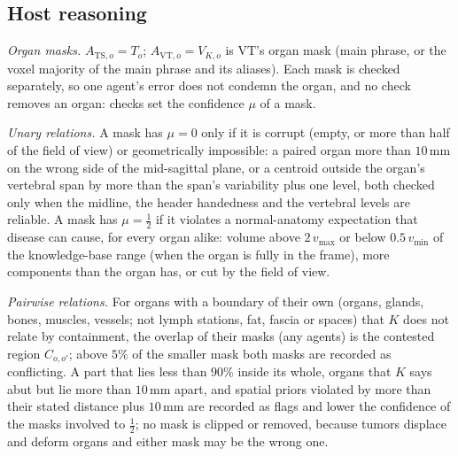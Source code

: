 \documentclass[fleqn,10pt]{olplainarticle}
\begin{document}
\subsection{Host reasoning}
\label{sec:host_details}
\emph{Organ masks.} $A_{\mathrm{TS},o}=T_o$; $A_{\mathrm{VT},o}=V_{K,o}$ is VT's organ mask (main phrase, or the voxel
majority of the main phrase and its aliases). Each mask is checked separately, so one agent's error does not condemn the
organ, and no check removes an organ: checks set the confidence $\mu$ of a mask.

\emph{Unary relations.} A mask has $\mu=0$ only if it is corrupt (empty, or more than half of the field of view) or
geometrically impossible: a paired organ more than $10$\,mm on the wrong side of the mid-sagittal plane, or a centroid
outside the organ's vertebral span by more than the span's variability plus one level, both checked only when the
midline, the header handedness and the vertebral levels are reliable. A mask has $\mu=\tfrac12$ if it violates a
normal-anatomy expectation that disease can cause, for every organ alike: volume above $2\,v_{\max}$ or below
$0.5\,v_{\min}$ of the knowledge-base range (when the organ is fully in the frame), more components than the organ has, or
cut by the field of view.

\emph{Pairwise relations.} For organs with a boundary of their own (organs, glands, bones, muscles, vessels; not lymph
stations, fat, fascia or spaces) that $K$ does not relate by containment, the overlap of their masks (any agents) is the
contested region $C_{o,o'}$; above $5\%$ of the smaller mask both masks are recorded as conflicting. A part that lies less
than $90\%$ inside its whole, organs that $K$ says abut but lie more than $10$\,mm apart, and spatial priors violated by more
than their stated distance plus $10$\,mm are recorded as flags and lower the confidence of the masks involved to
$\tfrac12$; no mask is clipped or removed, because tumors displace and deform organs and either mask may be the wrong one.
\end{document}

